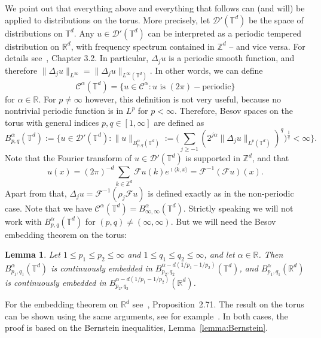 \documentclass[11pt,a4paper]{article}
\newtheorem{lemma}[theorem]{Lemma}
\theoremstyle{remark}
\newcommand{\R}{\mathbb{R}}
\newcommand{\Z}{\mathbb{Z}}
\newcommand{\CC}{\ensuremath{\mathscr{C}}}
\newcommand{\CD}{\ensuremath{\mathscr{D}}}
\newcommand{\CF}{\ensuremath{\mathscr{F}}}
\begin{document}
We point out that everything above and everything that follows can (and will) be applied to distributions on the torus. More precisely, let $\CD'(\mathbb{T}^{d} )$ be the space of distributions on $\mathbb{T}^{d}$. Any $u \in \CD' (\mathbb{T}^{d} )$ can be interpreted as a periodic tempered distribution on $\mathbb{R}^{d}$, with frequency spectrum contained in $\mathbb{Z}^{d}$ -- and vice versa. For details see~\cite{Schmeisser1987}, Chapter 3.2. In particular, $\Delta_{j} u$ is a periodic smooth function, and therefore $\| \Delta_{j} u\|_{L^{\infty}} = \| \Delta_{j} u\|_{L^{\infty} (\mathbb{T}^{d} )}$. In other words, we can define
\[
    \CC^\alpha(\mathbb{T}^d) = \{ u \in \CC^\alpha: u \text{ is } (2\pi)-\text{periodic}\}
\]
for $\alpha \in \R$. For $p \neq \infty$ however, this definition is not very useful, because no nontrivial periodic function is in $L^p$ for $p < \infty$. Therefore, Besov spaces on the torus with general indices $p,q \in [1,\infty]$ are defined as
\[
   B^\alpha_{p,q}(\mathbb{T}^d) := \biggl\{ u \in \mathcal{D}' (\mathbb{T}^d) : \lVert u\rVert_{B^{\alpha}_{p, q}(\mathbb{T}^d)} := \biggl( \sum_{j \ge - 1} (2^{j \alpha} \lVert \Delta_j u \rVert_{L^p(\mathbb{T}^d)})^q\biggr)^{\frac{1}{q}} < \infty \biggr\}.
\]
Note that the Fourier transform of $u \in \mathcal{D}'(\mathbb{T}^d)$ is supported in $\Z^d$, and that
\[
   u(x) = (2\pi)^{-d} \sum_{k \in \Z^d} \CF{u}(k) e^{\imath \langle k, x\rangle} = \CF^{-1} (\CF{u})(x).
\]
Apart from that, $\Delta_j u = \CF^{-1} (\rho_j \CF u)$ is defined exactly as in the non-periodic case. Note that we have $\CC^\alpha(\mathbb{T}^d) = B^\alpha_{\infty,\infty} (\mathbb{T}^d)$. Strictly speaking we will not work with $B^\alpha_{p,q}(\mathbb{T}^d)$ for $(p,q) \neq (\infty, \infty)$. But we will need the Besov embedding theorem on the torus:
\begin{lemma}\label{l:besov embedding torus}
   Let $1\leqslant p_1 \leqslant p_2 \leqslant \infty$ and $1\leqslant q_1 \leqslant q_2 \leqslant \infty$, and let $\alpha \in \R$. Then $B^{\alpha}_{p_1,q_1}(\mathbb{T}^d)$ is continuously embedded in $B^{\alpha - d(1/p_1 - 1/p_2)}_{p_2,q_2}(\mathbb{T}^d)$, and $B^{\alpha}_{p_1,q_1}(\mathbb{R}^d)$ is continuously embedded in $B^{\alpha - d(1/p_1 - 1/p_2)}_{p_2,q_2}(\mathbb{R}^d)$.
\end{lemma}
For the embedding theorem on $\R^d$ see~\cite{Bahouri2011}, Proposition~2.71. The result on the torus can be shown using the same arguments, see for example~\cite{Chemin2006}. In both cases, the proof is based on the Bernstein inequalities, Lemma~\ref{lemma:Bernstein}.
\end{document}
